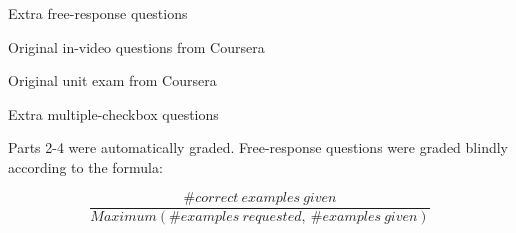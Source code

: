 \documentclass{sigchi}
\begin{document}
\begin{compactenum}
\item Extra free-response questions %
\item Original in-video questions from Coursera%
\item Original unit exam from Coursera%
\item Extra multiple-checkbox questions %
\end{compactenum}


Parts 2-4 were automatically graded. Free-response questions were graded blindly according to the formula:

\vspace{-4mm}

\[ \frac{\# correct\ examples\ given}{Maximum(\# examples\ requested,\ \# examples\ given)} \]


\end{document}
